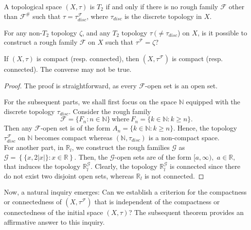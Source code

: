 \documentclass[11pt]{amsart}
\begin{document}
\begin{corollary}
    A topological space $(X,\tau)$ is $T_2$ if and only if there is no rough family $\mathscr{F}$ other than $\mathscr{F}^\#$ such that $\tau=\tau_{disc}^\mathscr{F}$, where $\tau_{disc}$ is the discrete topology in $X$.
\end{corollary}

\begin{question}
     For any non-$T_2$ topology $\zeta$, and any $T_2$ topology $\tau~
     (\neq \tau_{disc}$) on $X$,  is it possible to construct a rough family $\mathscr{F}$ on $X$ such that $\tau^{\mathscr{F}}=\zeta$?
\end{question}


\begin{theorem}\label{T8}
 If $(X,\tau)$ is compact (resp. connected), then $(X,\tau^\mathscr{F})$ is compact (resp. connected). The converse may not be true.
\end{theorem} 

\begin{proof}
    The proof is straightforward, as every $\mathscr{F}$-open set is an open set. 

    For the subsequent parts, we shall first focus on the space $\mathbb{N}$ equipped with the discrete topology $\tau_{disc}$. Consider the rough family $$\mathscr{F}=\{F_n: n\in \mathbb{N}\}~\text{where}~F_n=\{k\in \mathbb{N}: k\ge n\}.$$
    Then any $\mathscr{F}$-open set is of the form $A_n=\{k\in \mathbb{N}: k\ge n\}.$ Hence, the topology $\tau_{disc}^\mathscr{F}$ on $\mathbb{N}$ becomes compact whereas $(\mathbb{N},\tau_{disc})$ is a non-compact space.\\

    For another part, in $\mathbb{R}_l$, we construct the rough families $\mathcal{G}$ as $\mathcal{G}=\left\{\{x,2|x|\}: x\in \mathbb{R}\right\}.$
    Then, the $\mathcal{G}$-open sets are of the form $[a,\infty),$ $a\in\mathbb{R},$ that induces the topology $\mathbb{R}^{\mathcal{G}}_l$. Clearly, the topology $\mathbb{R}^{\mathcal{G}}_l$ is connected since there do not exist two disjoint open sets, whereas $\mathbb{R}_l$ is not connected. 
\end{proof}

Now, a natural inquiry emerges: Can we establish a criterion for the compactness or connectedness of $(X,\tau^\mathscr{F})$ that is independent of the compactness or connectedness of the initial space $(X,\tau)$? The subsequent theorem provides an affirmative answer to this inquiry.
\end{document}

